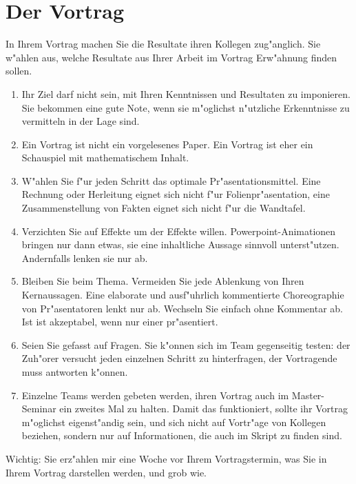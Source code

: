 \documentclass[a4paper]{article}
\begin{document}
\section{Der Vortrag}
In Ihrem Vortrag machen Sie die Resultate ihren Kollegen zug"anglich.
Sie w"ahlen aus, welche Resultate aus Ihrer Arbeit im Vortrag 
Erw"ahnung finden sollen.

\begin{enumerate}
\item
Ihr Ziel darf nicht sein, mit Ihren Kenntnissen und Resultaten
zu imponieren. 
Sie bekommen eine gute Note, wenn sie m"oglichst n"utzliche 
Erkenntnisse zu vermitteln in der Lage sind.
\item
Ein Vortrag ist nicht ein vorgelesenes Paper.
Ein Vortrag ist eher ein Schauspiel mit mathematischem Inhalt.
\item
W"ahlen Sie f"ur jeden Schritt das optimale Pr"asentationsmittel.
Eine Rechnung oder Herleitung eignet sich nicht f"ur Folienpr"asentation,
eine Zusammenstellung von Fakten eignet sich nicht f"ur die Wandtafel.
\item
Verzichten Sie auf Effekte um der Effekte willen.
Powerpoint-Animationen bringen nur dann etwas, sie eine inhaltliche
Aussage sinnvoll unterst"utzen.
Andernfalls lenken sie nur ab.
\item
Bleiben Sie beim Thema.
Vermeiden Sie jede Ablenkung von Ihren Kernaussagen.
Eine elaborate und ausf"uhrlich kommentierte Choreographie von
Pr"asentatoren lenkt nur ab.
Wechseln Sie einfach ohne Kommentar ab.
Ist ist akzeptabel, wenn nur einer pr"asentiert.
\item
Seien Sie gefasst auf Fragen. 
Sie k"onnen sich im Team gegenseitig testen: der Zuh"orer versucht
jeden einzelnen Schritt zu hinterfragen, der Vortragende muss
antworten k"onnen.
\item
Einzelne Teams werden gebeten werden, ihren Vortrag auch im
Master-Seminar ein zweites Mal zu halten.
Damit das funktioniert, sollte ihr Vortrag m"oglichst eigenst"andig sein,
und sich nicht auf Vortr"age von Kollegen beziehen, sondern nur auf
Informationen, die auch im Skript zu finden sind.
\end{enumerate}
Wichtig: Sie erz"ahlen mir eine Woche vor Ihrem Vortragstermin,
was Sie in Ihrem Vortrag darstellen werden, und grob wie.
\end{document}
